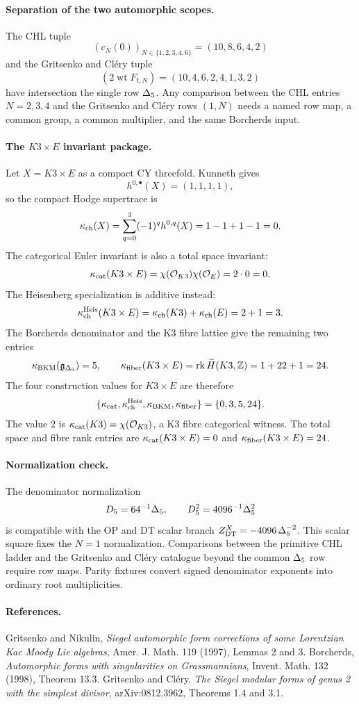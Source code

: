 \paragraph{Separation of the two automorphic scopes.}
The CHL tuple
\[
  (c_N(0))_{N\in\{1,2,3,4,6\}}=(10,8,6,4,2)
\]
and the Gritsenko and Cl\'ery tuple
\[
  (2\operatorname{wt} F_{t,N})=(10,4,6,2,4,1,3,2)
\]
have intersection the single row $\Delta_{5}$. Any comparison between the
CHL entries $N=2,3,4$ and the Gritsenko and Cl\'ery rows $(1,N)$ needs a
named row map, a common group, a common multiplier, and the same
Borcherds input.

\paragraph{The $K3\times E$ invariant package.}
Let $X=K3\times E$ as a compact CY threefold. Kunneth gives
\[
  h^{0,\bullet}(X)=(1,1,1,1),
\]
so the compact Hodge supertrace is
\[
  \kappa_{\mathrm{ch}}(X)=\sum_{q=0}^{3}(-1)^q h^{0,q}(X)=1-1+1-1=0.
\]
The categorical Euler invariant is also a total space invariant:
\[
  \kappa_{\mathrm{cat}}(K3\times E)
  =
  \chi(\mathcal O_{K3})\chi(\mathcal O_E)
  =
  2\cdot 0
  =
  0.
\]
The Heisenberg specialization is additive instead:
\[
  \kappa_{\mathrm{ch}}^{\mathrm{Heis}}(K3\times E)
  =
  \kappa_{\mathrm{ch}}(K3)+\kappa_{\mathrm{ch}}(E)
  =
  2+1
  =
  3.
\]
The Borcherds denominator and the K3 fibre lattice give the remaining
two entries
\[
  \kappa_{\mathrm{BKM}}(\mathfrak g_{\Delta_{5}})=5,\qquad
  \kappa_{\mathrm{fiber}}(K3\times E)=\operatorname{rk}\widetilde H(K3,\mathbb{Z})=1+22+1=24.
\]
The four construction values for $K3\times E$ are therefore
\[
  \{\kappa_{\mathrm{cat}},\kappa_{\mathrm{ch}}^{\mathrm{Heis}},\kappa_{\mathrm{BKM}},\kappa_{\mathrm{fiber}}\}
  =
  \{0,3,5,24\}.
\]
The value $2$ is $\kappa_{\mathrm{cat}}(K3)=\chi(\mathcal O_{K3})$, a K3 fibre
categorical witness. The total space and fibre rank entries are
$\kappa_{\mathrm{cat}}(K3\times E)=0$ and $\kappa_{\mathrm{fiber}}(K3\times E)=24$.

\paragraph{Normalization check.}
The denominator normalization
\[
  D_5=64^{-1}\Delta_{5},\qquad
  D_5^2=4096^{-1}\Delta_{5}^2
\]
is compatible with the OP and DT scalar branch
$Z^{X}_{\mathrm{DT}}=-4096\,\Delta_{5}^{-2}$. This scalar square fixes the
$N=1$ normalization. Comparisons between the primitive CHL ladder and the
Gritsenko and Cl\'ery catalogue beyond the common $\Delta_{5}$ row require
row maps. Parity fixtures convert signed denominator exponents into
ordinary root multiplicities.

\paragraph{References.}
Gritsenko and Nikulin, \emph{Siegel automorphic form corrections of some
Lorentzian Kac Moody Lie algebras}, Amer. J. Math. 119 (1997), Lemmas 2
and 3. Borcherds, \emph{Automorphic forms with singularities on
Grassmannians}, Invent. Math. 132 (1998), Theorem 13.3. Gritsenko and
Cl\'ery, \emph{The Siegel modular forms of genus 2 with the simplest
divisor}, arXiv:0812.3962, Theorems 1.4 and 3.1.
